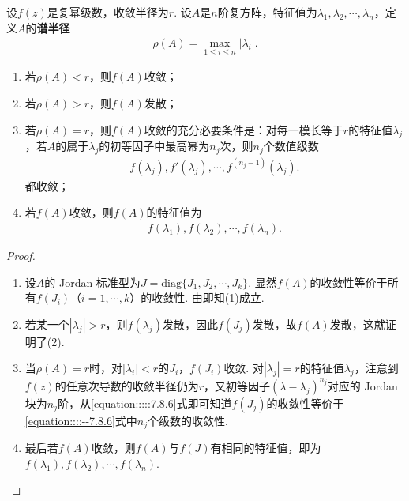 \documentclass[../../main.tex]{subfiles}%
\begin{document}
\begin{theorem}\label{theorem:复方阵幂级数的谱半径}
设\(f(z)\)是复幂级数，收敛半径为\(r\). 设\(A\)是\(n\)阶复方阵，特征值为\(\lambda_1,\lambda_2,\cdots,\lambda_n\)，定义\(A\)的\textbf{谱半径}
\begin{align*}
\rho(A) = \max_{1 \leqslant  i \leqslant  n}|\lambda_i|.
\end{align*}
\begin{enumerate}[(1)]
\item 若\(\rho(A) < r\)，则\(f(A)\)收敛；

\item 若\(\rho(A) > r\)，则\(f(A)\)发散；

\item 若\(\rho(A) = r\)，则\(f(A)\)收敛的充分必要条件是：对每一模长等于\(r\)的特征值\(\lambda_j\)，若\(A\)的属于\(\lambda_j\)的初等因子中最高幂为\(n_j\)次，则\(n_j\)个数值级数
\begin{align}
f(\lambda_j), f'(\lambda_j), \cdots, f^{(n_j - 1)}(\lambda_j) .\label{equation::::--7.8.6}
\end{align}
都收敛；

\item 若\(f(A)\)收敛，则\(f(A)\)的特征值为
\begin{align*}
f(\lambda_1), f(\lambda_2), \cdots, f(\lambda_n).
\end{align*} 
\end{enumerate}
\end{theorem}
\begin{proof}
\begin{enumerate}[(1)]
\item 设\(A\)的 Jordan 标准型为\(J = \mathrm{diag}\{J_1,J_2,\cdots,J_k\}\). 显然\(f(A)\)的收敛性等价于所有\(f(J_i)\)（\(i = 1,\cdots,k\)）的收敛性. 由即知(1)成立.

\item 若某一个\(|\lambda_j| > r\)，则\(f(\lambda_j)\)发散，因此\(f(J_j)\)发散，故\(f(A)\)发散，这就证明了(2).

\item 当\(\rho(A) = r\)时，对\(|\lambda_i| < r\)的\(J_i\)，\(f(J_i)\)收敛. 对\(|\lambda_j| = r\)的特征值\(\lambda_j\)，注意到\(f(z)\)的任意次导数的收敛半径仍为\(r\)，又初等因子\((\lambda - \lambda_j)^{n_j}\)对应的 Jordan 块为\(n_j\)阶，从\eqref{equation:::::7.8.6}式即可知道\(f(J_j)\)的收敛性等价于\eqref{equation::::--7.8.6}式中\(n_j\)个级数的收敛性.

\item 最后若\(f(A)\)收敛，则\(f(A)\)与\(f(J)\)有相同的特征值，即为\(f(\lambda_1),f(\lambda_2),\cdots,f(\lambda_n)\).
\end{enumerate}
\end{proof}
\end{document}
